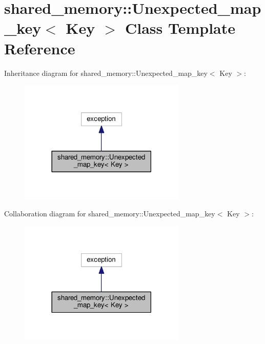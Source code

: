 \hypertarget{classshared__memory_1_1Unexpected__map__key}{}\section{shared\+\_\+memory\+:\+:Unexpected\+\_\+map\+\_\+key$<$ Key $>$ Class Template Reference}
\label{classshared__memory_1_1Unexpected__map__key}


Inheritance diagram for shared\+\_\+memory\+:\+:Unexpected\+\_\+map\+\_\+key$<$ Key $>$\+:
\nopagebreak
\begin{figure}[H]
\begin{center}
\leavevmode
\includegraphics[width=225pt]{classshared__memory_1_1Unexpected__map__key__inherit__graph}
\end{center}
\end{figure}


Collaboration diagram for shared\+\_\+memory\+:\+:Unexpected\+\_\+map\+\_\+key$<$ Key $>$\+:
\nopagebreak
\begin{figure}[H]
\begin{center}
\leavevmode
\includegraphics[width=225pt]{classshared__memory_1_1Unexpected__map__key__coll__graph}
\end{center}
\end{figure}
